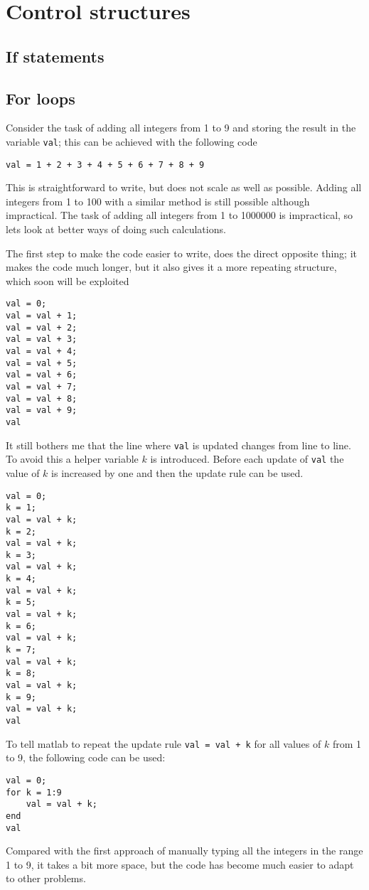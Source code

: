 \section{Control structures}

\subsection{If statements}






\subsection{For loops}

Consider the task of adding all integers from 1 to 9
and storing the result in the variable \verb!val!;  
this can be achieved with the following code 
\begin{lstlisting}
val = 1 + 2 + 3 + 4 + 5 + 6 + 7 + 8 + 9
\end{lstlisting}
This is straightforward to write, but does not scale
as well as possible.
Adding all integers from 1 to 100 with a similar method
is still possible although impractical.
The task of adding all integers from 1 to 1000000 
is impractical, so lets look at better ways of doing such 
calculations.

The first step to make the code easier to write, does the
direct opposite thing; it makes the code much longer, but it 
also gives it a more repeating structure, which soon will be 
exploited 
\begin{lstlisting}
val = 0;
val = val + 1;
val = val + 2;
val = val + 3;
val = val + 4;
val = val + 5;
val = val + 6;
val = val + 7;
val = val + 8;
val = val + 9;
val
\end{lstlisting}
It still bothers me that the line where \verb!val! is updated
changes from line to line.
To avoid this a helper variable $k$ is introduced.
Before each update of \verb!val! the value of $k$ is 
increased by one and then the update rule can be used.
\begin{lstlisting}
val = 0;
k = 1;
val = val + k;
k = 2;
val = val + k;
k = 3;
val = val + k;
k = 4;
val = val + k;
k = 5;
val = val + k;
k = 6;
val = val + k;
k = 7;
val = val + k;
k = 8;
val = val + k;
k = 9;
val = val + k;
val
\end{lstlisting}
To tell matlab to repeat the update rule \verb!val = val + k! for
all values of $k$ from 1 to 9, the following code can be used:
\begin{lstlisting}
val = 0;
for k = 1:9
    val = val + k;
end
val
\end{lstlisting}
Compared with the first approach of manually typing
all the integers in the range 1 to 9, it takes a bit more space, 
but the code has become much easier to adapt to other problems.


